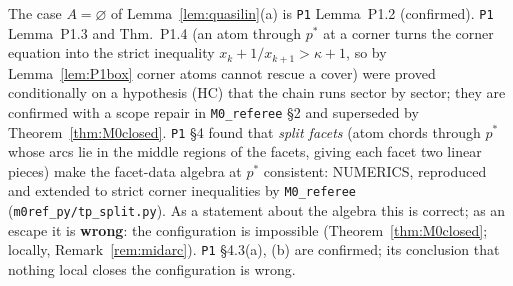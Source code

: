 \documentclass[11pt]{article}
\theoremstyle{definition}
\theoremstyle{remark}
\newcommand{\src}[1]{\texttt{#1}}
\begin{document}
The case $A=\varnothing$ of Lemma~\ref{lem:quasilin}(a) is \src{P1} Lemma~P1.2 (confirmed). \src{P1} Lemma~P1.3 and Thm.~P1.4 (an atom through $p^*$ at a corner turns the corner equation into the strict inequality $x_k+1/x_{k+1}>\kappa+1$, so by Lemma~\ref{lem:P1box} corner atoms cannot rescue a cover) were proved conditionally on a hypothesis (HC) that the chain runs sector by sector; they are confirmed with a scope repair in \src{M0\_referee} \S2 and superseded by Theorem~\ref{thm:M0closed}. \src{P1} \S4 found that \emph{split facets} (atom chords through $p^*$ whose arcs lie in the middle regions of the facets, giving each facet two linear pieces) make the facet-data algebra at $p^*$ consistent: NUMERICS, reproduced and extended to strict corner inequalities by \src{M0\_referee} (\src{m0ref\_py/tp\_split.py}). As a statement about the algebra this is correct; as an escape it is \textbf{wrong}: the configuration is impossible (Theorem~\ref{thm:M0closed}; locally, Remark~\ref{rem:midarc}). \src{P1} \S4.3(a), (b) are confirmed; its conclusion that nothing local closes the configuration is wrong.
\end{document}
